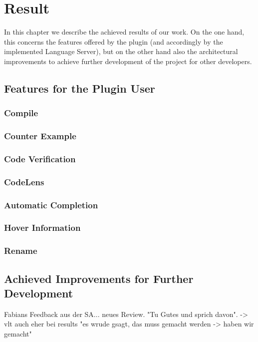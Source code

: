 \section{Result}
In this chapter we describe the achieved results of our work.
On the one hand, this concerns the features offered by the plugin
(and accordingly by the implemented Language Server),
but on the other hand also the architectural improvements to achieve further development of the project for other developers.

\subsection{Features for the Plugin User}

\subsubsection{Compile}
\subsubsection{Counter Example}
\subsubsection{Code Verification}
\subsubsection{CodeLens}
\subsubsection{Automatic Completion}
\subsubsection{Hover Information}
\subsubsection{Rename}

\subsection{Achieved Improvements for Further Development}
Fabians Feedback aus der SA... neues Review. "Tu Gutes und sprich davon". -> vlt auch eher bei results "es wrude gsagt, das muss gemacht werden -> haben wir gemacht"
